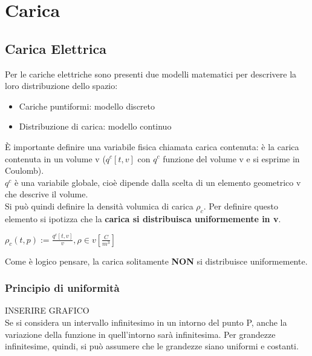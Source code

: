 \section{Carica}
\subsection{Carica Elettrica}
    Per le cariche elettriche sono presenti due modelli matematici per descrivere la loro distribuzione dello spazio:
    \begin{itemize}
        \item Cariche puntiformi: modello discreto
        \item Distribuzione di carica: modello continuo
    \end{itemize}

    È importante definire una variabile fisica chiamata carica contenuta: è la carica contenuta in un volume v ($q^c[t,v]$ con $q^c$ funzione del volume v e si esprime in Coulomb).\\
    $q^c$ è una variabile globale, cioè dipende dalla scelta di un elemento geometrico v che descrive il volume.\\
    Si può quindi definire la densità volumica di carica $\rho_c$. Per definire questo elemento si ipotizza che la \textbf{carica si distribuisca uniformemente in v}. \\
    \begin{center}
        $\rho_c(t,p) := \frac{q^c[t,v]}{v}, \rho \in v [\frac{C}{m^3} ]$\\
    \end{center}
    Come è logico pensare, la carica solitamente \textbf{NON} si distribuisce uniformemente.

    \subsubsection{Principio di uniformità}
        INSERIRE GRAFICO\\
        Se si considera un intervallo infinitesimo in un intorno del punto P, anche la variazione della funzione in quell'intorno sarà infinitesima. Per grandezze infinitesime, quindi, si può assumere che le grandezze siano uniformi e costanti.

